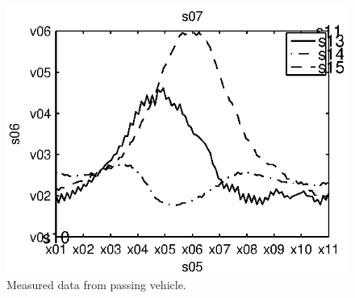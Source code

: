 \begin{subfigures}
\begin{figure}[!htbf]
\begin{minipage}{0.45\linewidth}
   \includegraphics[width=\linewidth]{images/est_data_three}
  \caption[Measured data from passing vehicle.]{Measured data from passing vehicle.\\}
  \label{fig-leastsqest}
  \end{minipage}
 \end{figure}


\end{subfigures}
